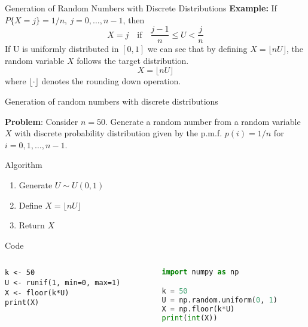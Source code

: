 \documentclass[8pt]{beamer}
\begin{document}
\begin{frame}[fragile]{Generation of Random Numbers with Discrete Distributions}
\textbf{Example:} If $P\{X = j\} = 1/n,\ j = 0,\dots,n-1$, then
\begin{equation*}
X = j \quad \text{if} \quad \frac{j-1}{n} \leq U < \frac{j}{n}
\end{equation*}
If U is uniformly distributed in $[0,1]$ we can see that by defining $X=\lfloor nU \rfloor$, the random variable $X$ follows the target distribution. 
$$
X = \lfloor nU \rfloor
$$
where $\lfloor \cdot \rfloor$ denotes the rounding down operation.
\vspace{2mm}
\end{frame}


\begin{frame}[fragile]{Generation of random numbers with discrete distributions}

\textbf{Problem}: Consider $n=50$. Generate a random number from a random variable $X$ with discrete probability distribution given by the p.m.f. 
$p(i)=1/n$ for $i=0,1,\ldots,n-1$.

\vspace{2mm}

\alert{Algorithm}
\begin{enumerate}
\item Generate $U\sim U(0,1)$
\item Define $X=\lfloor nU \rfloor$
\item Return $X$
\end{enumerate}

\vspace{2mm}

\alert{Code}

\begin{columns}[T]
\begin{column}{0.4\textwidth}
\begin{lstlisting}
k <- 50
U <- runif(1, min=0, max=1)
X <- floor(k*U)
print(X)
\end{lstlisting}
\end{column}

\begin{column}{0.4\textwidth}
\begin{lstlisting}[language=Python]
import numpy as np

k = 50
U = np.random.uniform(0, 1)
X = np.floor(k*U)
print(int(X))
\end{lstlisting}
\end{column}
\end{columns}
\end{frame}
\end{document}
